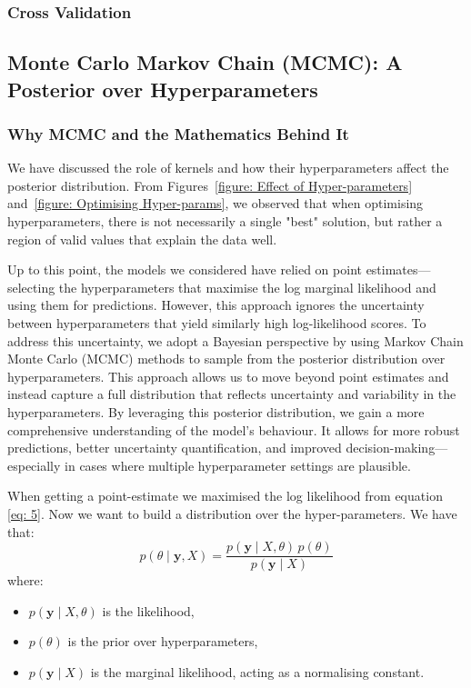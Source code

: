 \documentclass{article}
\begin{document}
\subsubsection{Cross Validation}


\subsection{Monte Carlo Markov Chain (MCMC): A Posterior over Hyperparameters}
\label{sec: MCMC}

\subsubsection{Why MCMC and the Mathematics Behind It}

We have discussed the role of kernels and how their hyperparameters affect the posterior distribution. From Figures~\ref{figure: Effect of Hyper-parameters} and~\ref{figure: Optimising Hyper-params}, we observed that when optimising hyperparameters, there is not necessarily a single "best" solution, but rather a region of valid values that explain the data well.

\noindent
Up to this point, the models we considered have relied on point estimates—selecting the hyperparameters that maximise the log marginal likelihood and using them for predictions. However, this approach ignores the uncertainty between hyperparameters that yield similarly high log-likelihood scores.
To address this uncertainty, we adopt a Bayesian perspective by using Markov Chain Monte Carlo (MCMC) methods to sample from the posterior distribution over hyperparameters. This approach allows us to move beyond point estimates and instead capture a full distribution that reflects uncertainty and variability in the hyperparameters.
By leveraging this posterior distribution, we gain a more comprehensive understanding of the model's behaviour. It allows for more robust predictions, better uncertainty quantification, and improved decision-making—especially in cases where multiple hyperparameter settings are plausible.

\bigskip
\noindent
When getting a point-estimate we maximised the log likelihood from equation \ref{eq: 5}. Now we want to build a distribution over the hyper-parameters. We have that:
\[
p(\theta \mid \mathbf{y}, X) = \frac{p(\mathbf{y} \mid X, \theta) \, p(\theta)}{p(\mathbf{y} \mid X)}
\]
where:
\begin{itemize}
    \item \( p(\mathbf{y} \mid X, \theta) \) is the likelihood,
    \item \( p(\theta) \) is the prior over hyperparameters,
    \item \( p(\mathbf{y} \mid X) \) is the marginal likelihood, acting as a normalising constant.
\end{itemize}
\end{document}
